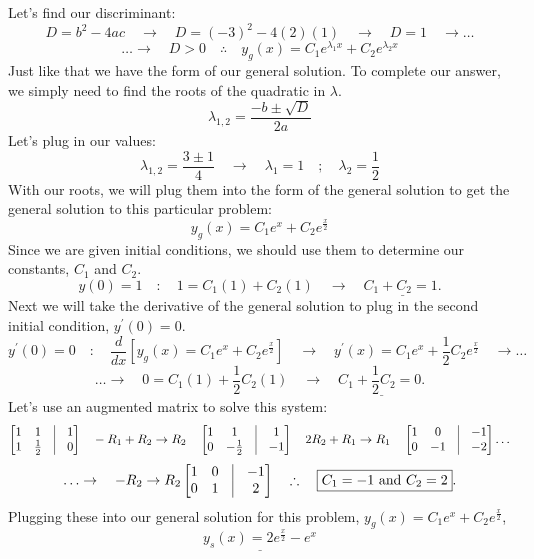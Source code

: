 \documentclass[a4paper,12pt]{article}
\begin{document}
Let's find our discriminant:
$$ D = b^2 - 4ac \quad\rightarrow \quad D = (-3)^2 - 4(2)(1) \quad\rightarrow \quad D = 1\quad\rightarrow \ldots$$
$$\ldots\rightarrow \quad \boxed{D > 0 \quad\therefore\quad y_g(x) = C_1e^{\lambda_1 x} + C_2e^{\lambda_2 x}} $$
Just like that we have the form of our general solution. To complete our answer, we simply need to find the roots of the quadratic in $\lambda$.
$$ \lambda_{1,2} = \frac{-b \pm \sqrt{D}}{2a} $$
Let's plug in our values:
$$ \lambda_{1,2} = \frac{3 \pm 1}{4} \quad\rightarrow\quad \boxed{\lambda_1 = 1 \quad ; \quad \lambda_2 = \frac{1}{2}} $$
With our roots, we will plug them into the form of the general solution to get the general solution to this particular problem:
$$ \boxed{y_g(x) = C_1e^{x} + C_2e^{\frac{x}{2}}} $$
Since we are given initial conditions, we should use them to determine our constants, $C_1$ and $C_2$.
$$y(0)=1 \quad : \quad 1 = C_1(1) + C_2(1) \quad\rightarrow \quad \underline{C_1 + C_2 = 1.}$$
Next we will take the derivative of the general solution to plug in the second initial condition, $y^\prime(0)=0.$
$$ y^\prime(0)=0 \quad : \quad \frac{d}{dx}\left[y_g(x) = C_1e^{x} + C_2e^{\frac{x}{2}}\right] \quad\rightarrow \quad y^\prime(x) = C_1e^x + \frac{1}{2}C_2e^{\frac{x}{2}} \quad \rightarrow \ldots$$
$$ \ldots\rightarrow \quad 0 = C_1(1) + \frac{1}{2}C_2(1) \quad\rightarrow \quad \underline{C_1 + \frac{1}{2}C_2 = 0.} $$
Let's use an augmented matrix to solve this system:
$$\begin{bmatrix}
	1 & 1 & \vline & 1 \\
	1 & \frac{1}{2} & \vline & 0
\end{bmatrix} 
\quad -R_1 + R_2 \rightarrow  R_2 \quad 
\begin{bmatrix}
	1 & 1 & \vline & 1 \\
	0 & -\frac{1}{2} & \vline & -1
\end{bmatrix}
\quad 2R_2 + R_1 \rightarrow  R_1 \quad
\begin{bmatrix}
	1 & 0 & \vline & -1 \\
	0 & -1 & \vline & -2
\end{bmatrix}\ldots
 $$ 
 $$ \ldots\rightarrow \quad -R_2 \rightarrow  R_2 
\begin{bmatrix}
	1 & 0 & \vline & -1 \\
	0 & 1 & \vline & 2
\end{bmatrix} \quad \therefore \quad  \boxed{C_1 = -1 \text{ and } C_2 = 2}.$$
Plugging these into our general solution for this problem, $y_g(x)=C_1 e^x+C_2 e^{\frac{x}{2}}$,
$$ \underline{\boxed{y_s(x) = 2e^{\frac{x}{2}} - e^{x}}} $$
\end{document}
